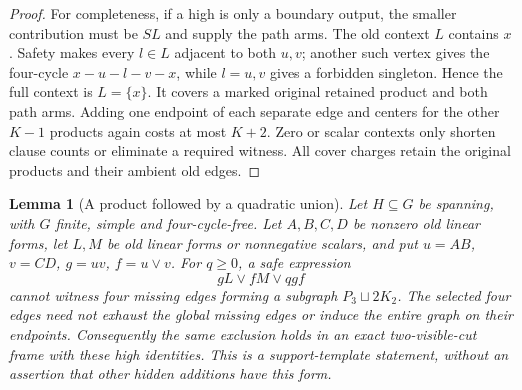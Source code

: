 \documentclass[11pt]{article}
\newtheorem{lemma}[theorem]{Lemma}
\theoremstyle{definition}
\theoremstyle{remark}
\begin{document}
\begin{proof}
For completeness, if a high is only a boundary output, the smaller contribution must be $SL$ and supply the path arms. The old context $L$ contains $x$. Safety makes every $l\in L$ adjacent to both $u,v$; another such vertex gives the four-cycle $x-u-l-v-x$, while $l=u,v$ gives a forbidden singleton. Hence the full context is $L=\{x\}$. It covers a marked original retained product and both path arms. Adding one endpoint of each separate edge and centers for the other $K-1$ products again costs at most $K+2$. Zero or scalar contexts only shorten clause counts or eliminate a required witness. All cover charges retain the original products and their ambient old edges.
\end{proof}

\begin{lemma}[A product followed by a quadratic union]\label{lem:pathproductunion}
Let $H\subseteq G$ be spanning, with $G$ finite, simple and four-cycle-free. Let $A,B,C,D$ be nonzero old linear forms, let $L,M$ be old linear forms or nonnegative scalars, and put $u=AB$, $v=CD$, $g=uv$, $f=u\vee v$. For $q\ge0$, a safe expression
\[
                 gL\vee fM\vee qgf
\]
cannot witness four missing edges forming a subgraph $P_3\sqcup2K_2$. The selected four edges need not exhaust the global missing edges or induce the entire graph on their endpoints. Consequently the same exclusion holds in an exact two-visible-cut frame with these high identities. This is a support-template statement, without an assertion that other hidden additions have this form.
\end{lemma}
\end{document}
